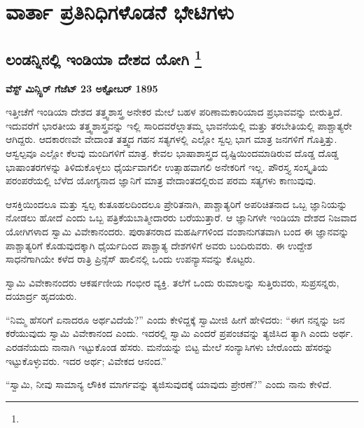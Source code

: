 

\part{ವಾರ್ತಾ ಪ್ರತಿನಿಧಿಗಳೊಡನೆ ಭೇಟಿಗಳು}

\chapter[ಲಂಡನ್ನಿನಲ್ಲಿ ಇಂಡಿಯಾ ದೇಶದ ಯೋಗಿ ]{ಲಂಡನ್ನಿನಲ್ಲಿ ಇಂಡಿಯಾ ದೇಶದ ಯೋಗಿ \protect\footnote{}}

\centerline{\textbf{ವೆಸ್ಟ್ ಮಿನ್ಸ್ಟಿರ್​ ಗೆಜೆಟ್​ 23 ಅಕ್ಟೋಬರ್​ 1895}}

\vskip 3pt

ಇತ್ತೀಚೆಗೆ ಇಂಡಿಯಾ ದೇಶದ ತತ್ತ್ವಶಾಸ್ತ್ರ ಅನೇಕರ ಮೇಲೆ ಬಹಳ ಪರಿಣಾಮಕಾರಿಯಾದ ಪ್ರಭಾವವನ್ನು ಬೀರುತ್ತಿದೆ. ಇದುವರೆಗೆ ಭಾರತೀಯ ತತ್ತ್ವಶಾಸ್ತ್ರವನ್ನು ಇಲ್ಲಿ ಸಾರಿದವರೆಲ್ಲಾ\break ತಮ್ಮ ಭಾವನೆಯಲ್ಲಿ ಮತ್ತು ತರಬೇತಿಯಲ್ಲಿ ಪಾಶ್ಚಾತ್ಯರೇ ಆಗಿದ್ದರು. ಆದಕಾರಣವೇ ವೇದಾಂತ ತತ್ತ್ವದ ಗಹನ ಸತ್ಯಗಳಲ್ಲಿ ಎಲ್ಲೋ ಸ್ವಲ್ಪ ಭಾಗ ಮಾತ್ರ ಜನಗಳಿಗೆ ಗೊತ್ತಿತ್ತು. ಆ\break ಸ್ವಲ್ಪವೂ ಎಲ್ಲೋ ಕೆಲವು ಮಂದಿಗಳಿಗೆ ಮಾತ್ರ. ಕೇವಲ ಭಾಷಾಶಾಸ್ತ್ರದ ದೃಷ್ಟಿಯಿಂದ\break ಮಾಡಿರುವ ದೊಡ್ಡ ದೊಡ್ಡ ಭಾಷಾಂತರಗಳನ್ನು ತಿಳಿದುಕೊಳ್ಳಲು ಧೈರ್ಯವಾಗಲೀ ಉತ್ಸಾಹವಾಗಲಿ ಅನೇಕರಿಗೆ ಇಲ್ಲ. ಪೌರಸ್ತ್ಯ ಸಂಸ್ಕೃತಿಯ ಪರಂಪರೆಯಲ್ಲಿ ಬೆಳೆದ ಯೋಗ್ಯನಾದ ಜ್ಞಾನಿಗೆ ಮಾತ್ರ ವೇದಾಂತದಲ್ಲಿರುವ ಪರಮ ಸತ್ಯಗಳು ಕಾಣುವುವು.

\vskip 3pt

ಆಸಕ್ತಿಯಿಂದಲೂ ಮತ್ತು ಸ್ವಲ್ಪ ಕುತೂಹಲದಿಂದಲೂ ಪ್ರೇರಿತನಾಗಿ, ಪಾಶ್ಚಾತ್ಯರಿಗೆ ಅಪರಿಚಿತನಾದ ಒಬ್ಬ ಜ್ಞಾನಿಯನ್ನು ನೋಡಲು ಹೋದೆ ಎಂದು ಒಬ್ಬ ಪತ್ರಿಕೆಯ\break ಬಾತ್ಮೀದಾರರು ಬರೆಯುತ್ತಾರೆ. ಆ ಜ್ಞಾನಿಗಳೇ ಇಂಡಿಯಾ ದೇಶದ ನಿಜವಾದ ಯೋಗಿಗಳಾದ ಸ್ವಾಮಿ ವಿವೇಕಾನಂದರು. ಪುರಾತನರಾದ ಮಹರ್ಷಿಗಳಿಂದ ವಂಶಾನುಗತವಾಗಿ ಬಂದ ಈ ಜ್ಞಾನವನ್ನು ಪಾಶ್ಚಾತ್ಯರಿಗೆ ಕೊಡುವುದಕ್ಕಾಗಿ ಧೈರ್ಯದಿಂದ ಪಾಶ್ಚಾತ್ಯ ದೇಶಗಳಿಗೆ ಅವರು ಬಂದಿರುವರು. ಈ ಉದ್ದೇಶ ಸಾಧನೆಗಾಗಿಯೇ ಕಳೆದ ರಾತ್ರಿ ಪ್ರಿನ್ಸೆಸ್​ ಹಾಲಿನಲ್ಲಿ ಒಂದು ಉಪನ್ಯಾಸವನ್ನು ಕೊಟ್ಟರು.

\vskip 3pt

ಸ್ವಾಮಿ ವಿವೇಕಾನಂದರು ಆಕರ್ಷಣೀಯ ಗಂಭೀರ ವ್ಯಕ್ತಿ. ತಲೆಗೆ ಒಂದು ರುಮಾಲನ್ನು ಸುತ್ತಿರುವರು, ಸುಪ್ರಸನ್ನರು, ದಯಾರ್ದ್ರ ಹೃದಯರು.

\vskip 3pt

“ನಿಮ್ಮ ಹೆಸರಿಗೆ ಏನಾದರೂ ಅರ್ಥವಿದೆಯೆ?” ಎಂದು ಕೇಳಿದ್ದಕ್ಕೆ ಸ್ವಾಮೀಜಿ ಹೀಗೆ ಹೇಳಿದರು: “ಈಗ ನನ್ನನ್ನು ಜನ ಕರೆಯುವುದು ಸ್ವಾಮಿ ವಿವೇಕಾನಂದ ಎಂದು. ಇದರಲ್ಲಿ ಸ್ವಾಮಿ ಎಂದರೆ ಪ್ರಪಂಚವನ್ನು ತ್ಯಜಿಸಿದ ತ್ಯಾಗಿ ಎಂದು ಅರ್ಥ. ಎರಡನೆಯದು ನಾನಾಗಿ ಇಟ್ಟುಕೊಂಡ ಹೆಸರು. ಮನೆಯನ್ನು ಬಿಟ್ಟ ಮೇಲೆ ಸಂನ್ಯಾಸಿಗಳು ಬೇರೊಂದು ಹೆಸರನ್ನು ಇಟ್ಟುಕೊಳ್ಳುವರು. ಇದರ ಅರ್ಥ; ವಿವೇಕದ ಆನಂದ.”

\vskip 3pt

“ಸ್ವಾಮಿ, ನೀವು ಸಾಮಾನ್ಯ ಲೌಕಿಕ ಮಾರ್ಗವನ್ನು ತ್ಯಜಿಸುವುದಕ್ಕೆ ಯಾವುದು ಪ್ರೇರಣೆ?” ಎಂದು ನಾನು ಕೇಳಿದೆ.

